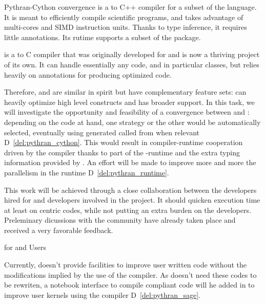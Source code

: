 \begin{Workpackage}{\thewpno}
\begin{task}{Pythran-Cython convergence}
  \Pythran is a \Python to C++ compiler for a subset of the \Python
  language. It is meant to efficiently compile scientific programs,
  and takes advantage of multi-cores and SIMD instruction units.
  Thanks to type inference, it requires little annotations. Its rutime
  supports a subset of the \Numpy package.

  \Cython is a \Python to C compiler that was originally developed for
  \Sage and is now a thriving project of its own. It can handle
  essentially any \Python code, and in particular classes, but relies
  heavily on annotations for producing optimized code.

  Therefore, \Pythran and \Cython are similar in spirit but have
  complementary feature sets: \Pythran can heavily optimize high level
  \Numpy constructs and \Cython has broader \Python support. In this
  task, we will investigate the opportunity and feasibility of a
  convergence between \Cython and \Pythran: depending on the code at
  hand, one strategy or the other would be automatically selected,
  eventually using \Pythran generated called from \Cython when
  relevant D~\ref{del:pythran_cython}. This would result in compiler-runtime
  cooperation driven by the \Cython compiler thanks to part of the
  \Pythran-runtime and the extra typing information provided by \Cython. An
  effort will be made to improve more and more the parallelism in the
  \Pythran runtime D~\ref{del:pythran_runtime}.

  This work will be achieved through a close collaboration between the \Pythran
  developers hired for \TheProject and \Cython developers involved in the \Sage
  project. It should quicken \Sage execution time at least on \Numpy centric
  codes, while not putting an extra burden on the developers.  Preleminary
  dicussions with the \Cython community have already taken place and received a
  very favorable feedback.


\end{task}

\begin{task}{\Pythran for \Sage and \Sage Users}
  \label{task:pythran_sage}

  Currently, \Sage doesn't provide facilities to improve user written
  \Python code without the modifications implied by the use of the \Cython
  compiler. As \Pythran doesn't need these codes to be rewriten, a notebook
  interface to compile \Pythran compliant code will he added in \Sage to
  improve user kernels using the \Pythran compiler D~\ref{del:pythran_sage}.


\end{task}
\end{Workpackage}
